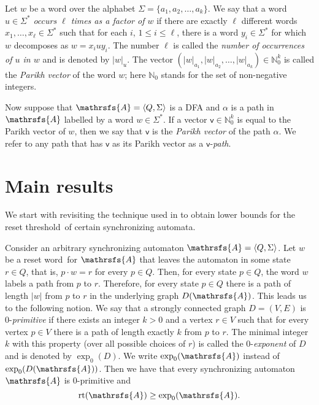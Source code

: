 \documentclass[11pt]{llncs}
\newcommand{\sa}{synchronizing automata}
\newcommand{\sw}{reset word}
\newcommand{\reth}{reset threshold}
\DeclareMathOperator{\rt}{rt}
\begin{document}
Let $w$ be a word over the alphabet $\Sigma = \{a_1, a_2, \ldots, a_k\}$. We
say that a word $u\in\Sigma^*$ \emph{occurs $\ell$ times as a factor of $w$} if
there are exactly $\ell$ different words $x_1, \ldots, x_\ell \in \Sigma^*$
such that for each $i$, $1 \leq i \leq \ell$, there is a word $y_i \in
\Sigma^*$ for which $w$ decomposes as $w = x_iuy_i$. The number $\ell$ is
called the \emph{number of occurrences of $u$ in $w$} and is denoted by
$|w|_u$. The vector $(|w|_{a_1}, |w|_{a_2}, \ldots,
|w|_{a_k})\in\mathbb{N}^k_0$ is called the \emph{Parikh vector} of the word
$w$; here $\mathbb{N}_0$ stands for the set of non-negative integers.

Now suppose that $\mathrsfs{A}=\langle Q,\Sigma\rangle$ is a DFA and $\alpha$
is a path in $\mathrsfs{A}$ labelled by a word $w\in\Sigma^*$. If a vector
$\mathsf{v}\in\mathbb{N}^k_0$ is equal to the Parikh vector of $w$, then we say
that $\mathsf{v}$ is the \emph{Parikh vector} of the path $\alpha$. We refer to
any path that has $\mathsf{v}$ as its Parikh vector as a
$\mathsf{v}$-\emph{path}.

\section{Main results}
\label{sea}

We start with revisiting the technique used in \cite{AGV} to obtain lower
bounds for the \reth\ of certain \sa.

Consider an arbitrary synchronizing automaton $\mathrsfs{A} = \langle Q, \Sigma
\rangle$. Let $w$ be a \sw\ for $\mathrsfs{A}$ that leaves the automaton in
some state $r \in Q$, that is, $p\cdot w=r$ for every $p\in Q$. Then, for every
state $p \in Q$, the word $w$ labels a path from $p$ to $r$. Therefore, for
every state $p \in Q$ there is a path of length $|w|$ from $p$ to $r$ in the
underlying graph $D(\mathrsfs{A})$. This leads us to the following notion. We
say that a strongly connected graph $D=(V,E)$ is 0-\emph{primitive} if there
exists an integer $k > 0$ and a vertex $r \in V$ such that for every vertex
$p\in V$ there is a path of length exactly $k$ from $p$ to $r$. The minimal
integer $k$ with this property (over all possible choices of $r$) is called the
0-\emph{exponent} of $D$ and is denoted by $\exp_0(D)$. We write
$\exp_0(\mathrsfs{A})$ instead of $\exp_0(D(\mathrsfs{A}))$. Then we have that
every synchronizing automaton $\mathrsfs{A}$ is 0-primitive and
\begin{equation}
\label{first inequality} \rt(\mathrsfs{A})\geq \exp_0(\mathrsfs{A}).
\end{equation}
\end{document}
